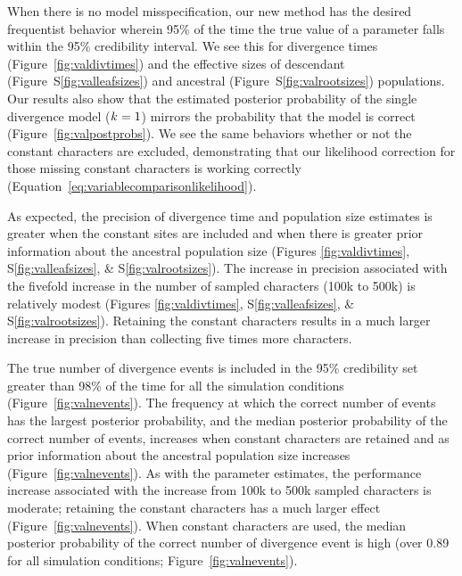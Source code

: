 When there is no model misspecification, our new method has the desired
frequentist behavior wherein 95\% of the time the true value of a parameter
falls within the 95\% credibility interval.
We see this for
divergence times
(Figure~\ref{fig:valdivtimes})
and the effective sizes of
descendant
(Figure~S\ref{fig:valleafsizes})
and ancestral
(Figure~S\ref{fig:valrootsizes})
populations.
Our results also show that the estimated posterior probability of the single
divergence model ($k_{}{} = 1$) mirrors the probability that the model
is correct 
(Figure~\ref{fig:valpostprobs}).
We see the same behaviors whether or not the constant characters are excluded,
demonstrating that our likelihood correction for those missing constant
characters is working correctly
(Equation~\ref{eq:variablecomparisonlikelihood}).

As expected, the precision of divergence time and population size estimates is
greater when the constant sites are included and when there is greater prior
information about the ancestral population size
(Figures \ref{fig:valdivtimes}, S\ref{fig:valleafsizes}, \&
S\ref{fig:valrootsizes}).
The increase in precision associated with the fivefold increase in the number
of sampled characters (100k to 500k) is relatively modest (Figures
\ref{fig:valdivtimes}, S\ref{fig:valleafsizes}, \& S\ref{fig:valrootsizes}).
Retaining the constant characters results in a much larger increase in
precision than collecting five times more characters.

The true number of divergence events is included in the 95\% credibility set
greater than 98\% of the time for all the simulation conditions
(Figure~\ref{fig:valnevents}).
The frequency at which the correct number of events has the largest posterior
probability, and the median posterior probability of the correct number of
events,
increases when constant characters are retained and as prior information about
the ancestral population size increases 
(Figure~\ref{fig:valnevents}).
As with the parameter estimates, the performance increase associated with the
increase from 100k to 500k sampled characters is moderate; retaining the
constant characters has a much larger effect (Figure~\ref{fig:valnevents}).
When constant characters are used, the median posterior
probability of the correct number of divergence event is high (over 0.89
for all simulation conditions; 
Figure~\ref{fig:valnevents}).

